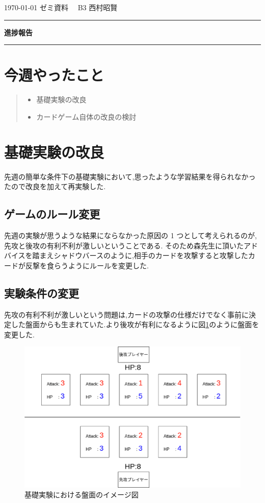 \documentclass{jarticle}     %
\begin{document}
  \noindent
  \onecolumn
  \hspace{1em}

  \today
  ゼミ資料
  \hfill
  \ \ B3 西村昭賢 

  \vspace{2mm}
  \hrule
  \begin{center}
  {\Large \bf 進捗報告}
  \end{center}
  \hrule
  \vspace{3mm}


\section{今週やったこと}

\begin{quote}
  \begin{itemize}
   \item 基礎実験の改良
   \item カードゲーム自体の改良の検討
  \end{itemize}
 \end{quote}

\section{基礎実験の改良}
先週の簡単な条件下の基礎実験において,思ったような学習結果を得られなかったので改良を加えて再実験した.

\subsection{ゲームのルール変更}
先週の実験が思うような結果にならなかった原因の 1 つとして考えられるのが,先攻と後攻の有利不利が激しいということである. そのため森先生に頂いたアドバイスを踏まえシャドウバースのように,相手のカードを攻撃すると攻撃したカードが反撃を食らうようにルールを変更した.

\subsection{実験条件の変更}
先攻の有利不利が激しいという問題は,カードの攻撃の仕様だけでなく事前に決定した盤面からも生まれていた.より後攻が有利になるように図\ref{fig:Figure1}のように盤面を変更した.


\begin{figure}[htbp]
  \centering
  \includegraphics[width=120mm]{assets/Figure1.eps}
  \caption{基礎実験における盤面のイメージ図}
  \label{fig:Figure1}
\end{figure}
\end{document}
